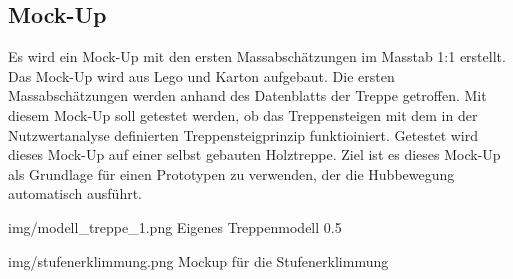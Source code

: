 \subsection{Mock-Up}
 
 Es wird ein Mock-Up mit den ersten Massabschätzungen im Masstab 1:1 erstellt. Das Mock-Up wird aus Lego und Karton aufgebaut. Die ersten Massabschätzungen werden anhand des Datenblatts der Treppe getroffen. Mit diesem Mock-Up soll getestet werden, ob das Treppensteigen mit dem in der Nutzwertanalyse definierten Treppensteigprinzip funktioiniert. Getestet wird dieses Mock-Up auf einer selbst gebauten Holztreppe.
 Ziel ist es dieses Mock-Up als Grundlage für einen Prototypen zu verwenden, der die Hubbewegung automatisch ausführt.
 
 \imagewidth
   {img/modell_treppe_1.png}
   {Eigenes Treppenmodell}
   {0.5\textwidth}

 \image
   {img/stufenerklimmung.png}
   {Mockup für die Stufenerklimmung}
   
\newpage